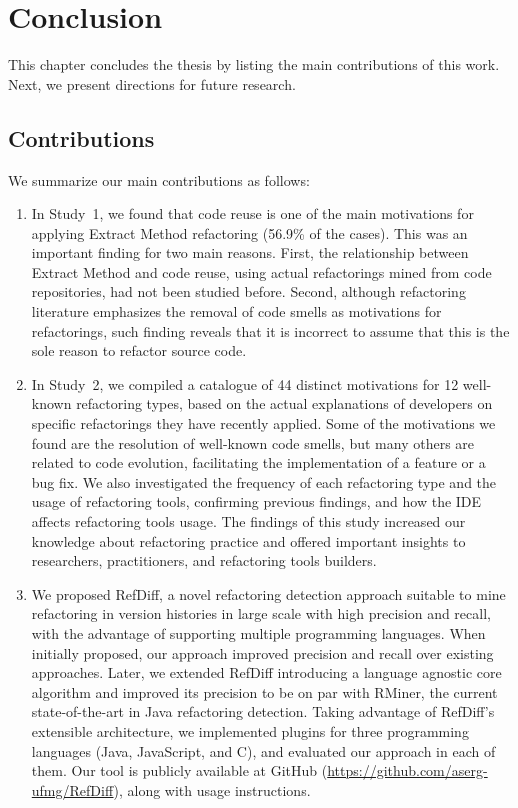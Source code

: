 
\chapter{Conclusion}
\label{ChConclusion}

This chapter concludes the thesis by listing the main contributions of this work. Next, we present directions for future research.



\section{Contributions}
\label{SecContributions}

We summarize our main contributions as follows:
\begin{enumerate}

\item In Study~1, we found that code reuse is one of the main motivations for applying Extract Method refactoring (56.9\% of the cases).
This was an important finding for two main reasons.
First, the relationship between Extract Method and code reuse, using actual refactorings mined from code repositories, had not been studied before.
Second, although refactoring literature emphasizes the removal of code smells as motivations for refactorings, such finding reveals that it is incorrect to assume that this is the sole reason to refactor source code.

\item In Study~2, we compiled a catalogue of 44 distinct motivations for 12 well-known refactoring types, based on the actual explanations of developers on specific refactorings they have recently applied.
Some of the motivations we found are the resolution of well-known code smells, but many others are related to code evolution, facilitating the implementation of a feature or a bug fix.
We also investigated the frequency of each refactoring type and the usage of refactoring tools, confirming previous findings, and how the IDE affects refactoring tools usage.
The findings of this study increased our knowledge about refactoring practice and offered important insights to researchers, practitioners, and refactoring tools builders.

\item We proposed RefDiff, a novel refactoring detection approach suitable to mine refactoring in version histories in large scale with high precision and recall, with the advantage of supporting multiple programming languages.
When initially proposed, our approach improved precision and recall over existing approaches.
Later, we extended RefDiff introducing a language agnostic core algorithm and improved its precision to be on par with RMiner, the current state-of-the-art in Java refactoring detection.
Taking advantage of RefDiff's extensible architecture, we implemented plugins for three programming languages (Java, JavaScript, and C), and evaluated our approach in each of them.
Our tool is publicly available at GitHub (\url{https://github.com/aserg-ufmg/RefDiff}), along with usage instructions.


\end{enumerate}
